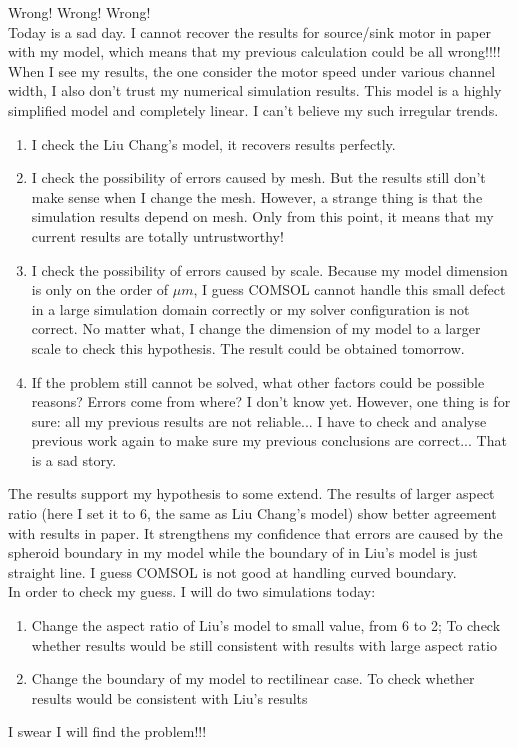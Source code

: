 \documentclass[fontsize=11pt, %
                             paper=a4, %
                             twoside, %
                             captions=tableheading,
                             index=totoc,
                             hyperref]{labbook}
\begin{document}
\begin{addmargin}[4cm]{0cm}
Wrong! Wrong! Wrong!\\
Today is a sad day. I cannot recover the results for source/sink motor in paper\cite{Liu2016} with my model, which means that my previous calculation could be all wrong!!!!\\

When I see my results, the one consider the motor speed under various channel width, I also don't trust my numerical simulation results. This model is a highly simplified model and completely linear. I can't believe my such irregular trends. \\
\begin{enumerate}
\item
I check the Liu Chang's model, it recovers results perfectly.\\
\item
I check the possibility of errors caused by mesh. But the results still don't make sense when I change the mesh. However, a strange thing is that the simulation results depend on mesh. Only from this point, it means that my current results are totally untrustworthy! \\
\item
I check the possibility of errors caused by scale. Because my model dimension is only on the order of $\mu m$, I guess COMSOL cannot handle this small defect in a large simulation domain correctly or my solver configuration is not correct. No matter what, I change the dimension of my model to a larger scale to check this hypothesis. The result could be obtained tomorrow.
\item
If the problem still cannot be solved, what other factors could be possible reasons? Errors come from where? I don't know yet. However, one thing is for sure: all my previous results are not reliable... I have to check and analyse previous work again to make sure my previous conclusions are correct... That is a sad story. 
\end{enumerate}

The results support my hypothesis to some extend. The results of larger aspect ratio (here I set it to 6, the same as Liu Chang's model) show better agreement with results in paper\cite{Liu2016}. It strengthens my confidence that errors are caused by the spheroid boundary in my model while the boundary of in Liu's model is just straight line. I guess COMSOL is not good at handling curved boundary.\\
In order to check my guess. I will do two simulations today:
\begin{enumerate}
\item
Change the aspect ratio of Liu's model to small value, from 6 to 2; To check whether results would be still consistent with results with large aspect ratio
\item
Change the boundary of my model to rectilinear case. To check whether results would be consistent with Liu's results
\end{enumerate}
I swear I will find the problem!!!


\end{addmargin}
\end{document}
